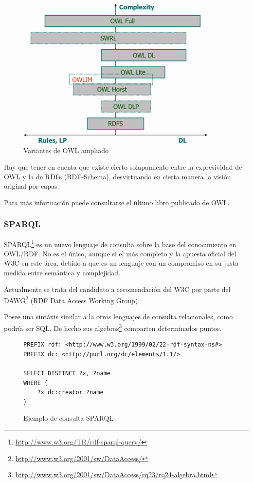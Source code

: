 \begin{figure}[H]
	\centering
	\includegraphics[width=10cm]{images/owl-dialects.png}
	\caption{Variantes de OWL ampliado}
	\label{fig:owlVariantsExtended}
\end{figure}

Hay que tener en cuenta que existe cierto solapamiento entre la expresividad de
OWL y la de RDFs (RDF-Schema), desvirtuando en cierta manera la visión original
por capas.

Para más información puede consultarse el último libro publicado de 
OWL\cite{OWLBook}.

\subsubsection{SPARQL}

SPARQL\footnote{\url{http://www.w3.org/TR/rdf-sparql-query/}} es un nuevo lenguaje
de consulta sobre la base del conocimiento en OWL/RDF. No es el único\cite{ComparisonRDFQuery},
aunque si el más completo y la apuesta oficial del W3C en este área, debido a que es
un lenguaje con un compromiso en su justa medida entre semántica y 
complejidad\cite{SemanticsComplexitySPARQL}. 

Actualmente se trata del candidato a recomendación del W3C por parte del 
DAWG\footnote{\url{http://www.w3.org/2001/sw/DataAccess/}} (RDF Data Access Working 
Group).

Posee una sintáxis similar a la otros lenguajes de consulta relacionales, como
podría ser SQL. De hecho sus 
algebras\footnote{\url{http://www.w3.org/2001/sw/DataAccess/rq23/rq24-algebra.html}} comparten\cite{RelationalAlgebraSPARQL} determinados puntos. 

\begin{figure}[H]
\lstset{language=SPARQL}
\begin{lstlisting}
PREFIX rdf: <http://www.w3.org/1999/02/22-rdf-syntax-ns#>
PREFIX dc: <http://purl.org/dc/elements/1.1/>

SELECT DISTINCT ?x, ?name
WHERE {
	?x dc:creator ?name
}
\end{lstlisting}
\caption{Ejemplo de consulta SPARQL}
\label{fig:ejemplo.sparql}
\end{figure}

